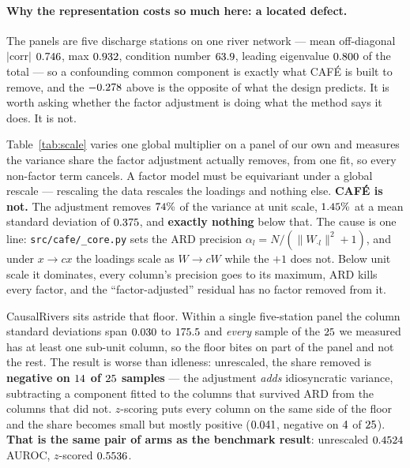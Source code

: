 \documentclass[10pt,twocolumn]{article}
\newcommand{\cafe}{CAF\'E}
\begin{document}
\paragraph{Why the representation costs so much here: a located defect.} The panels are
five discharge stations on one river network --- mean off-diagonal $|\mathrm{corr}|$
$0.746$, max $0.932$, condition number $63.9$, leading eigenvalue $0.800$ of the total
--- so a confounding common component is exactly what \cafe{} is built to remove, and the
$-0.278$ above is the opposite of what the design predicts. It is worth asking whether
the factor adjustment is doing what the method says it does. It is not.



Table~\ref{tab:scale} varies one global multiplier on a panel of our own and measures
the variance share the factor adjustment actually removes, from one fit, so every
non-factor term cancels. A factor model must be equivariant under a global rescale ---
rescaling the data rescales the loadings and nothing else. \textbf{\cafe{} is not.} The
adjustment removes $74\%$ of the variance at unit scale, $1.45\%$ at a mean
standard deviation of $0.375$, and \textbf{exactly nothing} below that. The cause is
one line: \texttt{src/cafe/\_core.py} sets the ARD precision
$\alpha_l = N/(\lVert W_{\cdot l}\rVert^2 + 1)$, and under $x\to cx$ the loadings scale
as $W\to cW$ while the $+1$ does not. Below unit scale it dominates, every column's
precision goes to its maximum, ARD kills every factor, and the ``factor-adjusted''
residual has no factor removed from it.

CausalRivers sits astride that floor. Within a single five-station panel the column
standard deviations span $0.030$ to $175.5$ and \emph{every} sample of the $25$ we
measured has at least one sub-unit column, so the floor bites on part of the panel and
not the rest. The result is worse than idleness: unrescaled, the share removed is
\textbf{negative on $14$ of $25$ samples} --- the adjustment \emph{adds}
idiosyncratic variance, subtracting a component fitted to the columns that survived ARD
from the columns that did not. $z$-scoring puts every column on the same side of the
floor and the share becomes small but mostly positive ($0.041$, negative on $4$
of $25$). \textbf{That is the same pair of arms as the benchmark result}: unrescaled
$0.4524$ AUROC, $z$-scored $0.5536$.
\end{document}
